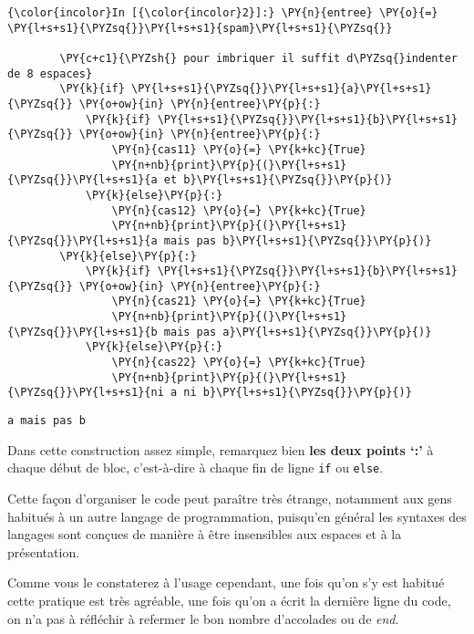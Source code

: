     \begin{Verbatim}[commandchars=\\\{\}]
{\color{incolor}In [{\color{incolor}2}]:} \PY{n}{entree} \PY{o}{=} \PY{l+s+s1}{\PYZsq{}}\PY{l+s+s1}{spam}\PY{l+s+s1}{\PYZsq{}}
        
        \PY{c+c1}{\PYZsh{} pour imbriquer il suffit d\PYZsq{}indenter de 8 espaces}
        \PY{k}{if} \PY{l+s+s1}{\PYZsq{}}\PY{l+s+s1}{a}\PY{l+s+s1}{\PYZsq{}} \PY{o+ow}{in} \PY{n}{entree}\PY{p}{:}
            \PY{k}{if} \PY{l+s+s1}{\PYZsq{}}\PY{l+s+s1}{b}\PY{l+s+s1}{\PYZsq{}} \PY{o+ow}{in} \PY{n}{entree}\PY{p}{:}
                \PY{n}{cas11} \PY{o}{=} \PY{k+kc}{True}
                \PY{n+nb}{print}\PY{p}{(}\PY{l+s+s1}{\PYZsq{}}\PY{l+s+s1}{a et b}\PY{l+s+s1}{\PYZsq{}}\PY{p}{)}
            \PY{k}{else}\PY{p}{:}
                \PY{n}{cas12} \PY{o}{=} \PY{k+kc}{True}
                \PY{n+nb}{print}\PY{p}{(}\PY{l+s+s1}{\PYZsq{}}\PY{l+s+s1}{a mais pas b}\PY{l+s+s1}{\PYZsq{}}\PY{p}{)}
        \PY{k}{else}\PY{p}{:}
            \PY{k}{if} \PY{l+s+s1}{\PYZsq{}}\PY{l+s+s1}{b}\PY{l+s+s1}{\PYZsq{}} \PY{o+ow}{in} \PY{n}{entree}\PY{p}{:}
                \PY{n}{cas21} \PY{o}{=} \PY{k+kc}{True}
                \PY{n+nb}{print}\PY{p}{(}\PY{l+s+s1}{\PYZsq{}}\PY{l+s+s1}{b mais pas a}\PY{l+s+s1}{\PYZsq{}}\PY{p}{)}
            \PY{k}{else}\PY{p}{:}
                \PY{n}{cas22} \PY{o}{=} \PY{k+kc}{True}
                \PY{n+nb}{print}\PY{p}{(}\PY{l+s+s1}{\PYZsq{}}\PY{l+s+s1}{ni a ni b}\PY{l+s+s1}{\PYZsq{}}\PY{p}{)}
\end{Verbatim}


    \begin{Verbatim}[commandchars=\\\{\}]
a mais pas b

    \end{Verbatim}

    Dans cette construction assez simple, remarquez bien \textbf{les deux
points `:'} à chaque début de bloc, c'est-à-dire à chaque fin de ligne
\texttt{if} ou \texttt{else}.

    Cette façon d'organiser le code peut paraître très étrange, notamment
aux gens habitués à un autre langage de programmation, puisqu'en général
les syntaxes des langages sont conçues de manière à être insensibles aux
espaces et à la présentation.

Comme vous le constaterez à l'usage cependant, une fois qu'on s'y est
habitué cette pratique est très agréable, une fois qu'on a écrit la
dernière ligne du code, on n'a pas à réfléchir à refermer le bon nombre
d'accolades ou de \emph{end}.

